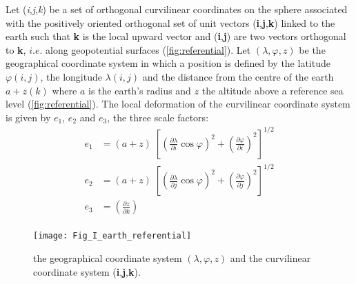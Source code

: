\documentclass[../main/NEMO_manual]{subfiles}
\begin{document}
Let (\textit{i},\textit{j},\textit{k}) be a set of orthogonal curvilinear coordinates on
the sphere associated with the positively oriented orthogonal set of unit vectors
(\textbf{i},\textbf{j},\textbf{k}) linked to the earth such that
\textbf{k} is the local upward vector and (\textbf{i},\textbf{j}) are two vectors orthogonal to \textbf{k},
$i.e.$ along geopotential surfaces (\autoref{fig:referential}).
Let $(\lambda,\varphi,z)$ be the geographical coordinate system in which a position is defined by
the latitude $\varphi(i,j)$, the longitude $\lambda(i,j)$ and
the distance from the centre of the earth $a+z(k)$ where $a$ is the earth's radius and
$z$ the altitude above a reference sea level (\autoref{fig:referential}).
The local deformation of the curvilinear coordinate system is given by $e_1$, $e_2$ and $e_3$,
the three scale factors:
\begin{equation}
  \label{eq:scale_factors}
  \begin{aligned}
    e_1 &=\left( {a+z} \right)\;\left[ {\left( {\frac{\partial \lambda}{\partial i}\cos \varphi } \right)^2
        +\left( {\frac{\partial \varphi }{\partial i}} \right)^2} \right]^{1/2} \\
    e_2 &=\left( {a+z} \right)\;\left[ {\left( {\frac{\partial \lambda }{\partial j}\cos \varphi } \right)^2+
        \left( {\frac{\partial \varphi }{\partial j}} \right)^2} \right]^{1/2} \\
    e_3 &=\left( {\frac{\partial z}{\partial k}} \right) \\
  \end{aligned}
\end{equation}

\begin{figure}[!tb]
  \begin{center}
    \texttt{[image: Fig\_I\_earth\_referential]}
    \caption{	\protect\label{fig:referential}
      the geographical coordinate system $(\lambda,\varphi,z)$ and the curvilinear
      coordinate system (\textbf{i},\textbf{j},\textbf{k}). }
  \end{center}
\end{figure}
\end{document}
